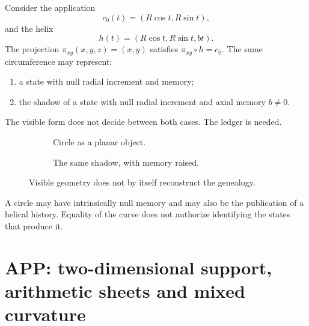 Consider the application
\[
 c_0(t)=(R\cos t,R\sin t),
\]
and the helix
\[
 h(t)=(R\cos t,R\sin t,bt).
\]
The projection \(\pi_{xy}(x,y,z)=(x,y)\) satisfies
\(\pi_{xy}\circ h=c_0\). The same circumference may represent:
\begin{enumerate}
\item a state with null radial increment and memory;
\item the shadow of a state with null radial increment and axial memory
\(b\neq0\).
\end{enumerate}
The visible form does not decide between both cases. The ledger is needed.

\begin{figure}[htbp]
\centering
\begin{subfigure}[t]{.46\textwidth}
\centering
{}
\caption{Circle as a planar object.}
\end{subfigure}\hfill
\begin{subfigure}[t]{.46\textwidth}
\centering
{}
\caption{The same shadow, with memory raised.}
\end{subfigure}
\caption{Visible geometry does not by itself reconstruct the genealogy.}
\label{espiral:fig:circulo-helice}
\end{figure}

\begin{resultbox}[title={Failure of fidelity of Archimedean evaluation on genealogical classes}]
A circle may have intrinsically null memory and may also
be the publication of a helical history. Equality of the curve does not
authorize identifying the states that produce it.
\end{resultbox}

\chapter{APP: two-dimensional support, arithmetic sheets and mixed curvature}

